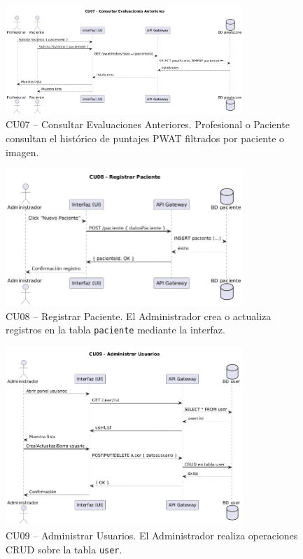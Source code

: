 \begin{figure}[H]
  \centering
  \includegraphics[width=0.8\textwidth]{imagenes/cu07_seq.png}
  \caption{CU07 – Consultar Evaluaciones Anteriores. Profesional o Paciente consultan el histórico de puntajes PWAT filtrados por paciente o imagen.}
  \label{fig:cu07_seq}
\end{figure}

\begin{figure}[H]
  \centering
  \includegraphics[width=0.8\textwidth]{imagenes/cu08_seq.png}
  \caption{CU08 – Registrar Paciente. El Administrador crea o actualiza registros en la tabla \texttt{paciente} mediante la interfaz.}
  \label{fig:cu08_seq}
\end{figure}

\begin{figure}[H]
  \centering
  \includegraphics[width=0.8\textwidth]{imagenes/cu09_seq.png}
  \caption{CU09 – Administrar Usuarios. El Administrador realiza operaciones CRUD sobre la tabla \texttt{user}.}
  \label{fig:cu09_seq}
\end{figure}

